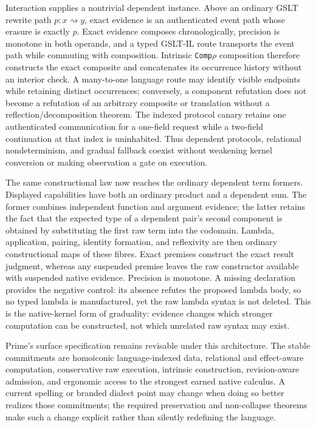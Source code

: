 \documentclass[11pt]{article}
\newcommand{\code}[1]{\texttt{#1}}
\begin{document}
Interaction supplies a nontrivial dependent instance.  Above an ordinary GSLT
rewrite path $p:x\rightsquigarrow y$, exact evidence is an authenticated event
path whose erasure is exactly $p$.  Exact evidence composes chronologically,
precision is monotone in both operands, and a typed GSLT-IL route transports the
event path while commuting with composition.  Intrinsic
\code{Comp}\ensuremath{\rho}
composition therefore constructs the exact composite and concatenates its
occurrence history without an interior check.  A many-to-one language route may
identify visible endpoints while retaining distinct occurrences; conversely, a
component refutation does not become a refutation of an arbitrary composite or
translation without a reflection/decomposition theorem.  The indexed protocol
canary retains one authenticated communication for a one-field request while a
two-field continuation at that index is uninhabited.  Thus dependent protocols,
relational nondeterminism, and gradual fallback coexist without weakening kernel
conversion or making observation a gate on execution.

The same constructional law now reaches the ordinary dependent term formers.
Displayed capabilities have both an ordinary product and a dependent sum.  The
former combines independent function and argument evidence; the latter retains
the fact that the expected type of a dependent pair's second component is
obtained by substituting the first raw term into the codomain.  Lambda,
application, pairing, identity formation, and reflexivity are then ordinary
constructional maps of these fibres.  Exact premises construct the exact result
judgment, whereas any suspended premise leaves the raw constructor available
with suspended native evidence.  Precision is monotone.  A missing declaration
provides the negative control: its absence refutes the proposed lambda body, so
no typed lambda is manufactured, yet the raw lambda syntax is not deleted.  This
is the native-kernel form of graduality: evidence changes which stronger
computation can be constructed, not which unrelated raw syntax may exist.

Prime's surface specification remains revisable under this architecture.  The
stable commitments are homoiconic language-indexed data, relational and
effect-aware computation, conservative raw execution, intrinsic construction,
revision-aware admission, and ergonomic access to the strongest earned native
calculus.  A current spelling or branded dialect point may change when doing so
better realizes those commitments; the required preservation and non-collapse
theorems make such a change explicit rather than silently redefining the
language.
\end{document}
